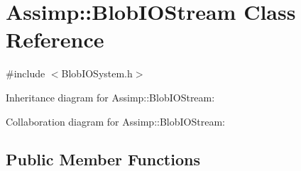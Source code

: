 \hypertarget{class_assimp_1_1_blob_i_o_stream}{\section{Assimp\+:\+:Blob\+I\+O\+Stream Class Reference}
\label{class_assimp_1_1_blob_i_o_stream}
}


{\ttfamily \#include $<$Blob\+I\+O\+System.\+h$>$}



Inheritance diagram for Assimp\+:\+:Blob\+I\+O\+Stream\+:


Collaboration diagram for Assimp\+:\+:Blob\+I\+O\+Stream\+:
\subsection*{Public Member Functions}
